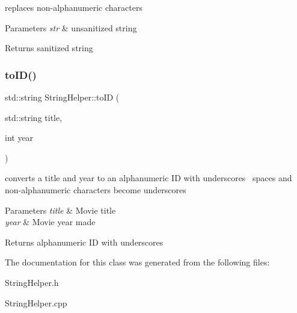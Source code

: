 replaces non-\/alphanumeric characters 
\begin{DoxyParams}{Parameters}
{\em str} & unsanitized string \\
\hline
\end{DoxyParams}
\begin{DoxyReturn}{Returns}
sanitized string 
\end{DoxyReturn}
\mbox{\label{class_string_helper_af1ebd6032d273477815fb71d50c47a82}} 
\subsubsection{\texorpdfstring{to\+I\+D()}{toID()}}
{\footnotesize\ttfamily std\+::string String\+Helper\+::to\+ID (\begin{DoxyParamCaption}\item[{std\+::string}]{title,  }\item[{int}]{year }\end{DoxyParamCaption})\hspace{0.3cm}{\ttfamily [static]}}

converts a title and year to an alphanumeric ID with underscores~\newline
spaces and non-\/alphanumeric characters become underscores 
\begin{DoxyParams}{Parameters}
{\em title} & Movie title \\
\hline
{\em year} & Movie year made \\
\hline
\end{DoxyParams}
\begin{DoxyReturn}{Returns}
alphanumeric ID with underscores 
\end{DoxyReturn}


The documentation for this class was generated from the following files\+:\begin{DoxyCompactItemize}
\item 
String\+Helper.\+h\item 
String\+Helper.\+cpp\end{DoxyCompactItemize}
